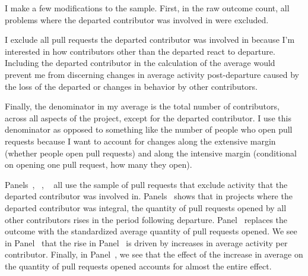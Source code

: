 \documentclass[12pt,notitlepage]{article}
\begin{document}


I make a few modifications to the sample. First, in the raw outcome count, all problems where the departed contributor was involved in were excluded. 

I exclude all pull requests the departed contributor was involved in because I'm interested in how contributors other than the departed react to departure. Including the departed contributor in the calculation of the average would prevent me from discerning changes in average activity post-departure caused by the loss of the departed or changes in behavior by other contributors. 

Finally, the denominator in my average is the total number of contributors, across all aspects of the project, except for the departed contributor. I use this denominator as opposed to something like the number of people who open pull requests because I want to account for changes along the extensive margin (whether people open pull requests) and along the intensive margin (conditional on opening one pull request, how many they open). 

Panels~, ~, ~ all use the sample of pull requests that exclude activity that the departed contributor was involved in. Panels~ shows that in projects where the departed contributor was integral, the quantity of pull requests opened by all other contributors rises in the period following departure. Panel~ replaces the outcome with the standardized average quantity of pull requests opened. We see in Panel~ that the rise in Panel~ is driven by increases in average activity per contributor. Finally, in Panel~, we see that the effect of the increase in average on the quantity of pull requests opened accounts for almost the entire effect.
\end{document}

